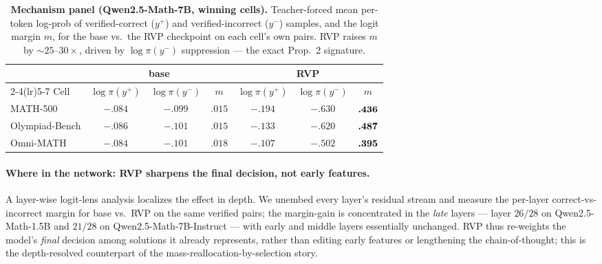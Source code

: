 \begin{table}[htbp]
\centering
\caption{\textbf{Mechanism panel (Qwen2.5-Math-7B, winning cells).} Teacher-forced mean per-token
log-prob of verified-correct ($y^{+}$) and verified-incorrect ($y^{-}$) samples, and the logit
margin $m$, for the base vs.\ the RVP checkpoint on each cell's own pairs. RVP raises $m$ by
$\sim25$--$30\times$, driven by $\log\pi(y^{-})$ suppression --- the exact Prop.~2 signature.}
\label{tab:mech-win}
\begin{tabular}{lccc@{\hskip 1.5em}ccc}
\toprule
 & \multicolumn{3}{c}{base} & \multicolumn{3}{c}{RVP} \\
\cmidrule(lr){2-4}\cmidrule(lr){5-7}
Cell & $\log\pi(y^{+})$ & $\log\pi(y^{-})$ & $m$ & $\log\pi(y^{+})$ & $\log\pi(y^{-})$ & $m$ \\
\midrule
MATH-500       & $-.084$ & $-.099$ & $.015$ & $-.194$ & $-.630$ & $\textbf{.436}$ \\
Olympiad-Bench & $-.086$ & $-.101$ & $.015$ & $-.133$ & $-.620$ & $\textbf{.487}$ \\
Omni-MATH      & $-.084$ & $-.101$ & $.018$ & $-.107$ & $-.502$ & $\textbf{.395}$ \\
\bottomrule
\end{tabular}
\end{table}

\paragraph{Where in the network: RVP sharpens the final decision, not early features.}
A layer-wise logit-lens analysis localizes the effect in depth. We unembed every layer's residual
stream and measure the per-layer correct-vs-incorrect margin for base vs.\ RVP on the same verified
pairs; the margin-gain is concentrated in the \emph{late} layers --- layer $26/28$ on
Qwen2.5-Math-1.5B and $21/28$ on Qwen2.5-Math-7B-Instruct --- with early and middle layers
essentially unchanged. RVP thus re-weights the model's \emph{final} decision among solutions it
already represents, rather than editing early features or lengthening the chain-of-thought; this is
the depth-resolved counterpart of the mass-reallocation-by-selection story.

